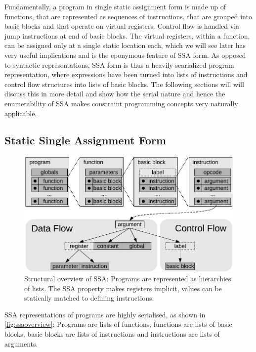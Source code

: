     Fundamentally, a program in single static assignment form is made up of
    functions, that are represented as sequences of instructions, that are
    grouped into basic blocks and that operate on virtual registers.
    Control flow is handled via jump instructions at end of basic blocks.
    The virtual registers, within a function, can be assigned only at a single
    static location each, which we will see later has very useful implications
    and is the eponymous feature of SSA form.
    As opposed to syntactic representations, SSA form is thus a heavily
    searialized program representation, where expressions have been turned into
    lists of instructions and control flow structures into lists of basic
    blocks.
    The following sections will will discuss this in more detail and show how
    the serial nature and hence the enumerability of SSA makes constraint
    programming concepts very naturally applicable.

\subsection{Static Single Assignment Form}

\begin{figure}[t]
\centering
\includegraphics{figures/ssaoverview}
\caption{Structural overview of SSA: Programs are represented as hierarchies of
    lists. The SSA property makes registers implicit, values can be statically
    matched to defining instructions.}
\label{fig:ssaoverview}
\end{figure}

    SSA representations of programs are highly serialised, as shown in
    \autoref{fig:ssaoverview}:
    Programs are lists of functions, functions are lists of basic blocks,
    basic blocks are lists of instructions and instructions are lists of
    arguments.

